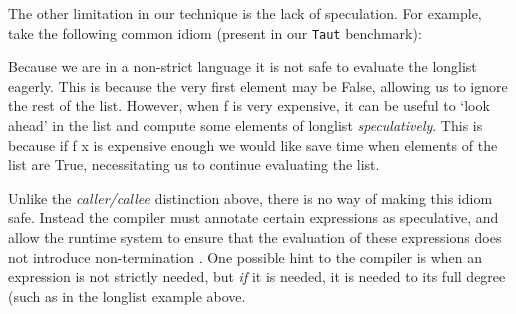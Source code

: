 The other limitation in our technique is the lack of speculation. For example,
take the following common idiom (present in our \verb|Taut| benchmark):

\begin{haskell}
\end{haskell}

Because we are in a non-strict language it is not safe to evaluate the
\<longlist\> eagerly. This is because the very first element may be \<False\>,
allowing us to ignore the rest of the list. However, when \<f\> is very
expensive, it can be useful to `look ahead' in the list and compute some
elements of \<longlist\> \emph{speculatively}. This is because if \<f x\> is
expensive enough we would like save time when elements of the list are
\<True\>, necessitating us to continue evaluating the list.

Unlike the \emph{caller/callee} distinction above, there is no way of making
this idiom safe.  Instead the compiler must annotate certain expressions as
speculative, and allow the runtime system to ensure that the evaluation of
these expressions does not introduce non-termination
\citep{checkland1994speculative, mattson1993effective}. One possible hint to
the compiler is when an expression is not strictly needed, but \emph{if} it is
needed, it is needed to its full degree (such as in the \<longlist\> example
above.
